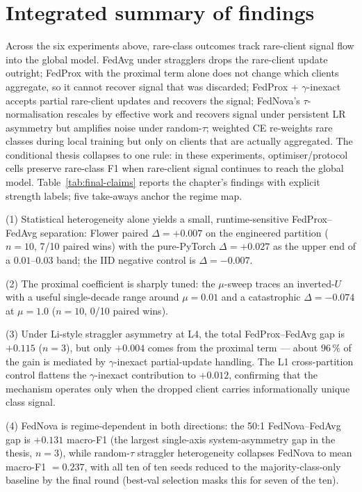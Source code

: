 \documentclass[11pt,a4paper]{report}
\begin{document}
\section{Integrated summary of findings}
\label{sec:integrated-summary}

Across the six experiments above, rare-class outcomes track rare-client
signal flow into the global model. FedAvg under stragglers drops the
rare-client update outright; FedProx with the proximal term alone does
not change which clients aggregate, so it cannot recover signal that was
discarded; FedProx + $\gamma$-inexact accepts partial rare-client updates
and recovers the signal; FedNova's $\tau$-normalisation rescales by
effective work and recovers signal under persistent LR asymmetry but
amplifies noise under random-$\tau$; weighted CE re-weights rare classes
during local training but only on clients that are actually aggregated.
The conditional thesis collapses to one rule: in these experiments,
optimiser/protocol cells preserve rare-class F1 when rare-client signal
continues to reach the global model. Table~\ref{tab:final-claims} reports the chapter's findings
with explicit strength labels; five take-aways anchor the regime map.

(1) Statistical heterogeneity alone yields a small, runtime-sensitive
FedProx--FedAvg separation: Flower paired $\Delta = +0.007$ on the
engineered partition ($n=10$, 7/10 paired wins) with the pure-PyTorch
$\Delta = +0.027$ as the upper end of a $0.01$--$0.03$ band; the IID
negative control is $\Delta = -0.007$.

(2) The proximal coefficient is sharply tuned: the $\mu$-sweep traces an
inverted-$U$ with a useful single-decade range around $\mu = 0.01$ and a
catastrophic $\Delta = -0.074$ at $\mu = 1.0$ ($n=10$, 0/10 paired wins).

(3) Under Li-style straggler asymmetry at L4, the total FedProx--FedAvg gap
is $+0.115$ ($n=3$), but only $+0.004$ comes from the proximal term ---
about $96\,\%$ of the gain is mediated by $\gamma$-inexact partial-update
handling. The L1 cross-partition control flattens the $\gamma$-inexact
contribution to $+0.012$, confirming that the mechanism operates only when
the dropped client carries informationally unique class signal.

(4) FedNova is regime-dependent in both directions: the 50:1 FedNova--FedAvg
gap is $+0.131$ macro-F1 (the largest single-axis system-asymmetry gap in
the thesis, $n=3$), while random-$\tau$ straggler heterogeneity collapses
FedNova to mean macro-F1 $= 0.237$, with all ten of ten seeds reduced to
the majority-class-only baseline by the final round (best-val selection
masks this for seven of the ten).
\end{document}
